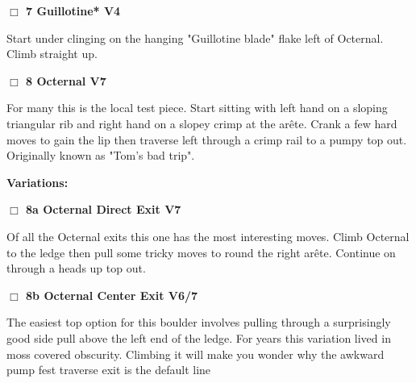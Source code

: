 \begin{multicols}{2}
\needspace{2em}
\label{rt:Guillotine}
\colorbox{RoyalBlue!20}{
\parbox{0.95\linewidth}{
\hspace{-1ex}\textbf{$\Box$
7 Guillotine* V4  
}}}
\begin{adjustwidth}{1.3em}{}			

Start under clinging on the hanging "Guillotine blade" flake left of Octernal. Climb straight up.
\end{adjustwidth}




\needspace{2em}
\label{rt:Octernal}
\colorbox{Goldenrod!20}{
\parbox{0.95\linewidth}{
\hspace{-1ex}\textbf{$\Box$
8 Octernal V7  
}}}
\begin{adjustwidth}{1.3em}{}			

For many this is the local test piece. Start sitting with left hand on a sloping triangular rib and right hand on a slopey crimp at the arête. Crank a few hard moves to gain the lip then traverse left through a crimp rail to a pumpy top out. Originally known as "Tom's bad trip".
\end{adjustwidth}


\begin{adjustwidth}{0.5cm}{}				
\needspace{4em}
\textbf{Variations:} \newline

\needspace{2em}
\label{vr:Octernal Direct Exit}
\colorbox{Goldenrod!20}{
\parbox{0.95\linewidth}{
\hspace{-1ex}\textbf{$\Box$
8a Octernal Direct Exit V7  
}}}
\begin{adjustwidth}{1.3em}{}			

Of all the Octernal exits this one has the most interesting moves. Climb Octernal to the ledge then pull some tricky moves to round the right arête. Continue on through a heads up top out.
\end{adjustwidth}




\needspace{2em}
\label{vr:Octernal Center Exit}
\colorbox{Goldenrod!20}{
\parbox{0.95\linewidth}{
\hspace{-1ex}\textbf{$\Box$
8b Octernal Center Exit V6/7  
}}}
\begin{adjustwidth}{1.3em}{}			

The easiest top option for this boulder involves pulling through a surprisingly good side pull above the left end of the ledge. For years this variation lived in moss covered obscurity. Climbing it will make you wonder why the awkward pump fest traverse exit is the default line
\end{adjustwidth}





\end{adjustwidth}
\end{multicols}
